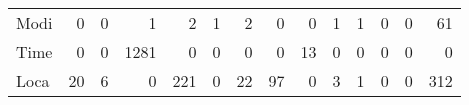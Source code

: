 \begin{table}[htbp!]
\begin{adjustbox}{width=1\textwidth}
\begin{tabular}{lrrrrrrrrrrrrr}
Modi     &                    0 &                  0 &                  1 &                   2 &                   1 &                 2 &                    0 &                    0 &                 1 &                    1 &                  0 &                      0 &                 61 \\
Time     &                    0 &                  0 &               1281 &                   0 &                   0 &                 0 &                    0 &                   13 &                 0 &                    0 &                  0 &                      0 &                  0 \\
Loca     &                   20 &                  6 &                  0 &                 221 &                   0 &                22 &                   97 &                    0 &                 3 &                    1 &                  0 &                      0 &                312 \\
\bottomrule
\end{tabular}
\end{adjustbox}
\end{table}
